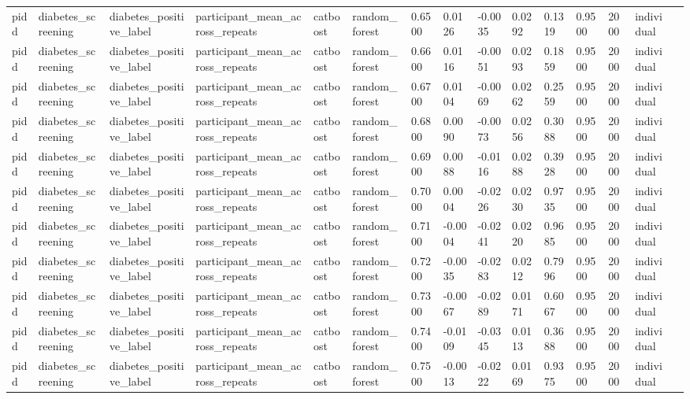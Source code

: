 \begin{tabular}{lllllllllllllll}
pidd & diabetes\_screening & diabetes\_positive\_label & participant\_mean\_across\_repeats & catboost & random\_forest & 0.6500 & 0.0126 & -0.0035 & 0.0292 & 0.1319 & 0.9500 & 2000 & individual &  \\
pidd & diabetes\_screening & diabetes\_positive\_label & participant\_mean\_across\_repeats & catboost & random\_forest & 0.6600 & 0.0116 & -0.0051 & 0.0293 & 0.1859 & 0.9500 & 2000 & individual &  \\
pidd & diabetes\_screening & diabetes\_positive\_label & participant\_mean\_across\_repeats & catboost & random\_forest & 0.6700 & 0.0104 & -0.0069 & 0.0262 & 0.2559 & 0.9500 & 2000 & individual &  \\
pidd & diabetes\_screening & diabetes\_positive\_label & participant\_mean\_across\_repeats & catboost & random\_forest & 0.6800 & 0.0090 & -0.0073 & 0.0256 & 0.3088 & 0.9500 & 2000 & individual &  \\
pidd & diabetes\_screening & diabetes\_positive\_label & participant\_mean\_across\_repeats & catboost & random\_forest & 0.6900 & 0.0088 & -0.0116 & 0.0288 & 0.3928 & 0.9500 & 2000 & individual &  \\
pidd & diabetes\_screening & diabetes\_positive\_label & participant\_mean\_across\_repeats & catboost & random\_forest & 0.7000 & 0.0004 & -0.0226 & 0.0230 & 0.9735 & 0.9500 & 2000 & individual &  \\
pidd & diabetes\_screening & diabetes\_positive\_label & participant\_mean\_across\_repeats & catboost & random\_forest & 0.7100 & -0.0004 & -0.0241 & 0.0220 & 0.9685 & 0.9500 & 2000 & individual &  \\
pidd & diabetes\_screening & diabetes\_positive\_label & participant\_mean\_across\_repeats & catboost & random\_forest & 0.7200 & -0.0035 & -0.0283 & 0.0212 & 0.7996 & 0.9500 & 2000 & individual &  \\
pidd & diabetes\_screening & diabetes\_positive\_label & participant\_mean\_across\_repeats & catboost & random\_forest & 0.7300 & -0.0067 & -0.0289 & 0.0171 & 0.6067 & 0.9500 & 2000 & individual &  \\
pidd & diabetes\_screening & diabetes\_positive\_label & participant\_mean\_across\_repeats & catboost & random\_forest & 0.7400 & -0.0109 & -0.0345 & 0.0113 & 0.3688 & 0.9500 & 2000 & individual &  \\
pidd & diabetes\_screening & diabetes\_positive\_label & participant\_mean\_across\_repeats & catboost & random\_forest & 0.7500 & -0.0013 & -0.0222 & 0.0169 & 0.9375 & 0.9500 & 2000 & individual &  \\

\end{tabular}

